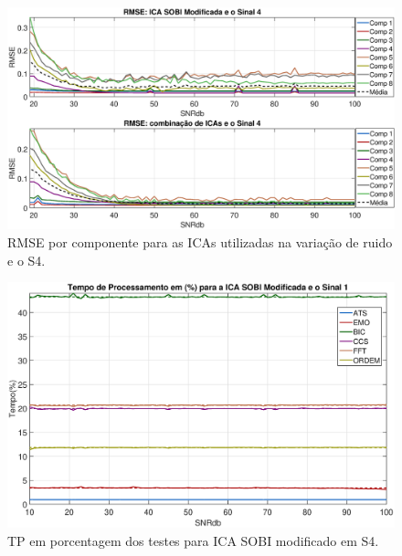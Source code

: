\documentclass[a4paper,12pt]{monografia}
\theoremstyle{plain}
\theoremstyle{definition}
\theoremstyle{remark}
\begin{document}
\begin{figure}[!htb]
    \begin{center}
    \advance\leftskip -1.5cm
    \includegraphics[scale=0.45]{imagens/ImagensParaOAnexo/RMSEcompRTodasICAsSinal4.eps}
    \caption{RMSE por componente para as ICAs utilizadas na variação de ruido e o S4.}
    \label{fig:RMSERS4}    
    \end{center}
\end{figure}

\begin{figure}[!htb]
    \begin{center}
    \advance\leftskip -1.5cm
    \includegraphics[scale=0.45]{imagens/ImagensParaOAnexo/TPPRICASOBImodSinal1.eps}
    \caption{TP em porcentagem dos testes para ICA SOBI modificado em S4.}
    \label{fig:TPSMRS4}    
    \end{center}
\end{figure}
\end{document}
